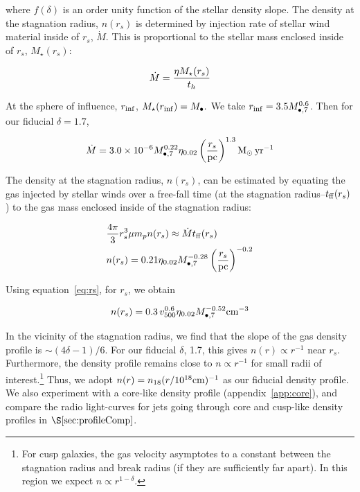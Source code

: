 \documentclass[usenatbib,fleqn]{mnras}
\newcommand{\Mbh}[1][]{M_{\bullet#1}}
\newcommand{\Msun}{{\rm M_\odot}}
\newcommand{\rs}{r_s}
\begin{document}
where $f(\delta)$ is an order unity function of the stellar density slope.
The density at the stagnation radius, $n(\rs)$ is determined by
injection rate of stellar wind material inside of $\rs$,
$\dot{M}$. This is proportional to the stellar mass enclosed inside of
$\rs$, $M_{\star}(\rs)$:

\begin{equation}
\dot{M}=\frac{\eta M_{\rm \star}(\rs)}{t_h}
\label{eq:dotM}
\end{equation}

At the sphere of influence, $r_{\rm inf}$, $M_{\star}(r_{\rm
  inf})=\Mbh.$ We take $r_{\rm inf}=3.5 \Mbh[,7]^{0.6}$. Then for our
fiducial $\delta=1.7$,

\begin{equation}
\dot{M}= 3.0 \times 10^{-6} \Mbh[,7]^{0.22} \eta_{0.02} \left(\frac{r_s}{\rm
  pc}\right)^{1.3} \Msun \, {\rm yr}^{-1}
\end{equation}


The density at the stagnation radius, $n(\rs)$, can be estimated
by equating the gas injected by stellar winds over a free-fall time
(at the stagnation radius--$t_{\rm ff} (\rs)$) to the gas mass
enclosed inside of the stagnation radius:

\begin{align}
  &\frac{4 \pi}{3} \rs^3 \mu m_p n(r_s) \approx \dot{M} t_{\rm ff}
  (\rs) \nonumber\\
  &n(r_s) = 0.21 \eta_{0.02} \Mbh[,7]^{-0.28} \left(\frac{r_s}{\rm
      pc}\right)^{-0.2}
\label{eq:nrs}
\end{align}
 
Using equation~\eqref{eq:rs}, for $r_s$, we obtain 

\begin{equation}
n(r_s)=0.3 \, v_{500}^{0.6} \eta_{0.02} \Mbh[,7]^{-0.52} {\rm cm}^{-3}
\label{eq:nrs2}
\end{equation}

In the vicinity of the stagnation radius, we find that the slope of
the gas density profile is $\sim (4\delta-1)/6$. For our fiducial
$\delta$, 1.7, this gives $n(r)\propto r^{-1}$ near
$\rs$. Furthermore, the density profile remains close to $n\propto
r^{-1}$ for small radii of interest.\footnote{For cusp galaxies, the
  gas velocity asymptotes to a constant between the stagnation radius
  and break radius (if they are sufficiently far apart). In this
  region we expect $n\propto r^{1-\delta}$.}  Thus, we adopt $n(r)=
n_{18} (r/10^{18} {\rm cm})^{-1}$ as our fiducial density profile.  We
also experiment with a core-like density profile
(appendix~\ref{app:core}), and compare the radio light-curves for jets
going through core and cusp-like density profiles in
$\S\ref{sec:profileComp}$.
\end{document}

